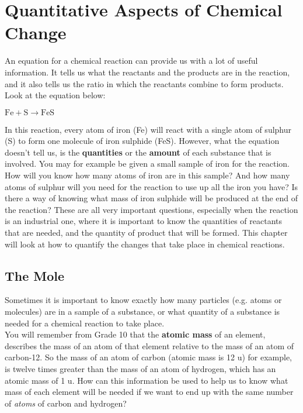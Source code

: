 \chapter{Quantitative Aspects of Chemical Change}
\label{chap:quant}

An equation for a chemical reaction can provide us with a lot of useful information. It tells us what the reactants and the products are in the reaction, and it also tells us the ratio in which the reactants combine to form products. Look at the equation below:

\begin{center}
${\text{Fe} + \text{S} \rightarrow \text{FeS}}$\\
\end{center}

In this reaction, every atom of iron (Fe) will react with a single atom of sulphur (S) to form one molecule of iron sulphide (FeS). However, what the equation doesn't tell us, is the \textbf{quantities} or the \textbf{amount} of each substance that is involved. You may for example be given a small sample of iron for the reaction. How will you know how many atoms of iron are in this sample? And how many atoms of sulphur will you need for the reaction to use up all the iron you have? Is there a way of knowing what mass of iron sulphide will be produced at the end of the reaction? These are all very important questions, especially when the reaction is an industrial one, where it is important to know the quantities of reactants that are needed, and the quantity of product that will be formed. This chapter will look at how to quantify the changes that take place in chemical reactions.




\section{The Mole}
\label{sec:quant:mole}

Sometimes it is important to know exactly how many particles (e.g. atoms or molecules) are in a sample of a substance, or what quantity of a substance is needed for a chemical reaction to take place.\\

You will remember from Grade 10 that the \textbf{atomic mass} of an element, describes the mass of an atom of that element relative to the mass of an atom of carbon-12. So the mass of an atom of carbon (atomic mass is 12 u) for example, is twelve times greater than the mass of an atom of hydrogen, which has an atomic mass of 1 u. How can this information be used to help us to know what mass of each element will be needed if we want to end up with the same number of \textit{atoms} of carbon and hydrogen?\\

